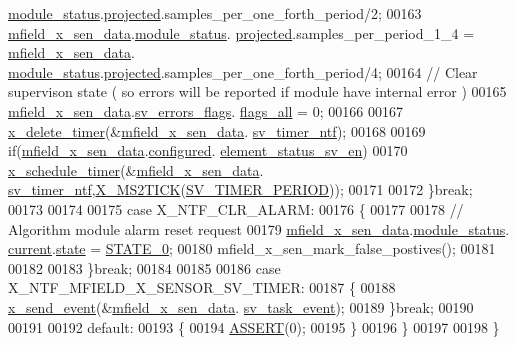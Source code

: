 \begin{DoxyCode}
      \hyperlink{a00025_adfab5a5d8b45a93dfb13edb24e2b80e3}{module\_status}.\hyperlink{a00019_af2267fb093fb5dcaa006a570a6da3b6b}{projected}.samples\_per\_one\_forth\_period/2;
00163            \hyperlink{a00052_af8c531b1ba5fea148fb9111e06058f92}{mfield\_x\_sen\_data}.\hyperlink{a00025_adfab5a5d8b45a93dfb13edb24e2b80e3}{module\_status}.
      \hyperlink{a00019_af2267fb093fb5dcaa006a570a6da3b6b}{projected}.samples\_per\_period\_1\_4  = \hyperlink{a00052_af8c531b1ba5fea148fb9111e06058f92}{mfield\_x\_sen\_data}.
      \hyperlink{a00025_adfab5a5d8b45a93dfb13edb24e2b80e3}{module\_status}.\hyperlink{a00019_af2267fb093fb5dcaa006a570a6da3b6b}{projected}.samples\_per\_one\_forth\_period/4;
00164             \textcolor{comment}{// Clear supervison state ( so errors will be reported if module have internal error )}
00165           \hyperlink{a00052_af8c531b1ba5fea148fb9111e06058f92}{mfield\_x\_sen\_data}.\hyperlink{a00025_aaeec6b0609dba31393f337abf1cce3d3}{sv\_errors\_flags}.
      \hyperlink{a00022_a1caa87b00c878186140c3bac9c8acf3b}{flags\_all} = 0;
00166 
00167           \hyperlink{a00036_ab69e9af4cfa717e870d587906283635c}{x\_delete\_timer}(&\hyperlink{a00052_af8c531b1ba5fea148fb9111e06058f92}{mfield\_x\_sen\_data}.
      \hyperlink{a00025_ada91b200053f2d93e3639dc4ee3415b4}{sv\_timer\_ntf});
00168 
00169           \textcolor{keywordflow}{if}(\hyperlink{a00052_af8c531b1ba5fea148fb9111e06058f92}{mfield\_x\_sen\_data}.\hyperlink{a00025_a94b2d1f6ea4ab334c74d24984dd27843}{configured}.
      \hyperlink{a00021_afeb3f74725269028a60926f98890c22b}{element\_status\_sv\_en})
00170           \hyperlink{a00036_a9e3befaa21e83f196f74201deed85346}{x\_schedule\_timer}(&\hyperlink{a00052_af8c531b1ba5fea148fb9111e06058f92}{mfield\_x\_sen\_data}.
      \hyperlink{a00025_ada91b200053f2d93e3639dc4ee3415b4}{sv\_timer\_ntf},\hyperlink{a00036_a1732cd929c486b3a225824bb2b3dba36}{X\_MS2TICK}(\hyperlink{a00023_a8a535456285f4602701c814d7b69cc68}{SV\_TIMER\_PERIOD}));
00171 
00172         \}\textcolor{keywordflow}{break};
00173 
00174 
00175          \textcolor{keywordflow}{case} X\_NTF\_CLR\_ALARM:
00176         \{
00177 
00178            \textcolor{comment}{// Algorithm module alarm reset request}
00179              \hyperlink{a00052_af8c531b1ba5fea148fb9111e06058f92}{mfield\_x\_sen\_data}.\hyperlink{a00025_adfab5a5d8b45a93dfb13edb24e2b80e3}{module\_status}.
      \hyperlink{a00019_acf41ffc11da291c2f9f0fcb02ee72b98}{current}.\hyperlink{a00019_a6b8d8e916bc56265a3fd279bd26b6d1b}{state} = \hyperlink{a00021_ad6739dbbe5581cac99b7dc8a5e09949c}{STATE\_0};
00180              mfield\_x\_sen\_mark\_false\_postives();
00181 
00182 
00183         \}\textcolor{keywordflow}{break};
00184 
00185 
00186         \textcolor{keywordflow}{case} X\_NTF\_MFIELD\_X\_SENSOR\_SV\_TIMER:
00187         \{
00188            \hyperlink{a00036_a4bc3d03c8d62c8237329ed4e969fbc1b}{x\_send\_event}(&\hyperlink{a00052_af8c531b1ba5fea148fb9111e06058f92}{mfield\_x\_sen\_data}.
      \hyperlink{a00025_a43c345f39ea3aefbb60ef1ef57fe5d83}{sv\_task\_event});
00189         \}\textcolor{keywordflow}{break};
00190 
00191 
00192         \textcolor{keywordflow}{default}:
00193         \{
00194             \hyperlink{a00072_abb8ff8e213ac9f6fb21d2b968583b936}{ASSERT}(0);
00195         \}
00196     \}
00197 
00198 \}
\end{DoxyCode}


